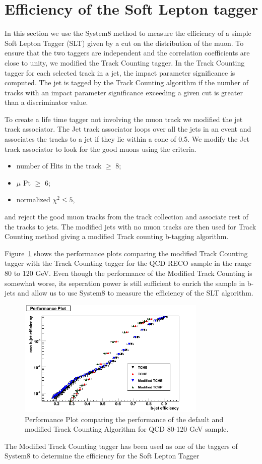 \section{Efficiency of the Soft Lepton tagger}

In this section we use the System8 method to measure the efficiency of a 
simple Soft Lepton Tagger (SLT) given by a cut on the \ptrel distribution of the 
muon. To ensure that the two taggers are independent and the correlation 
coefficients are close to unity, we modified the Track Counting tagger.
In the Track Counting tagger for each selected track in a jet, the impact 
parameter significance is computed. The jet is tagged by the Track Counting 
algorithm if the number of tracks with an impact parameter significance 
exceeding a given cut is greater than a discriminator value.

To create a life time tagger not involving the muon track we modified 
the jet track associator. The Jet track associator  loops over all the jets 
in an event and associates the tracks to a jet if they lie within a cone of 
0.5. We modify the Jet track associator to look for the good muons using the
criteria.
\begin{itemize} 
\item   number of Hits in the track $ \ge $ 8;
\item   $\mu $ Pt $ \ge $ 6;
\item   normalized $\chi^{2} \le 5$,
\end{itemize}   
and reject the good muon tracks from the track collection and associate rest 
of the tracks to jets. The modified jets with no muon tracks are then used 
for Track Counting method giving a modified Track counting b-tagging algorithm.

Figure~\ref{fig:Performanceplot} shows the performance plots
 comparing the modified Track Counting tagger with the Track Counting tagger
for the QCD RECO sample in the \pt range 80 to 120 GeV. Even though the 
performance of the Modified Track Counting is somewhat worse, its seperation
power is still sufficient to enrich the sample in b-jets and allow us to use 
System8 to measure the efficiency of the SLT algorithm.


\begin{figure}[htbp]
  \begin{center}
    \includegraphics[width=90mm]{Figures/QCD_80_120.png}
  \end{center}
  \caption{Performance Plot comparing the performance of the default and 
modified Track Counting Algorithm for QCD 80-120 GeV sample.}
  \label{fig:Performanceplot}
\end{figure}


The Modified Track Counting tagger has been used as one of the taggers of
System8 to determine the efficiency for the Soft Lepton Tagger




